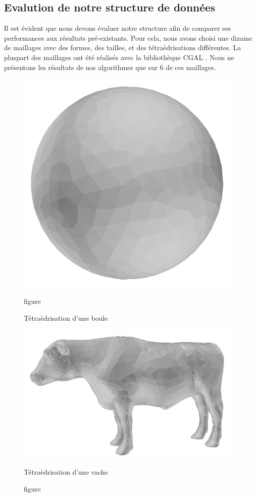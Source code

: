 \documentclass[a4paper,11pt,openany]{article}
\begin{document}
\subsection{Evalution de notre structure de données}
\noindent
Il est évident que nous devons évaluer notre structure afin de comparer ses performances aux résultats pré-existants. Pour cela, nous avons choisi une dizaine de maillages avec des formes, des tailles, et des tétraèdrisations différentes. La pluspart des maillages ont été réalisés avec la bibliothèque CGAL \cite{CGAL}. Nous ne présentons les résultats de nos algorithmes que sur 6 de ces maillages.
\begin{figure}[H]
\centering
\begin{minipage}{.5\textwidth}
  \centering
  \includegraphics[scale=0.2]{Images/ball}
  \caption{figure}{Tétraèdrisation d'une boule}
  \label{fig:ball}
\end{minipage}%
\begin{minipage}{.5\textwidth}
  \centering
  \includegraphics[scale=0.2]{Images/cow}
  \caption{figure}{Tétraèdrisation d'une vache}
  \label{fig:cow}
\end{minipage}
\end{figure}
\end{document}
